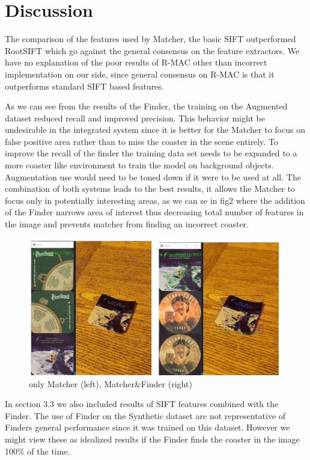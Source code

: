 \documentclass{article}
\begin{document}
\section{Discussion}

The comparison of the features used by Matcher, the basic SIFT outperformed RootSIFT which go against the general consensus on the feature extractors.
We have no explanation of the poor results of R-MAC other than incorrect implementation on our side, since general consensus on R-MAC is that it outperforms standard SIFT based features.

As we can see from the results of the Finder, the training on the Augmented dataset reduced recall and improved precision.
This behavior might be undesirable in the integrated system since it is better for the Matcher to focus on false positive area rather than to miss the coaster in the scene entirely. To improve the recall of the finder the training data set needs to be expanded to a more coaster like environment to train the model on background objects. Augmentation use would need to be toned down if it were to be used at all.
The combination of both systems leads to the best results, it allows the Matcher to focus only in potentially interesting areas, as we can se in fig2 where the addition of the Finder narrows area of interest thus decreasing total number of features in the image and prevents matcher from finding an incorrect coaster.

\begin{figure}[H]
    \center
    \includegraphics[scale=0.4]{img/addedFinder.jpg}
    \caption{only Matcher (left), Matcher\&Finder (right)}
\end{figure}

In section 3.3 we also included results of SIFT features combined with the Finder. The use of Finder on the Synthetic dataset are not representative of Finders general performance since it was trained on this dataset.
However we might view these as idealized results if the Finder finds the coaster in the image 100\% of the time.
\end{document}
